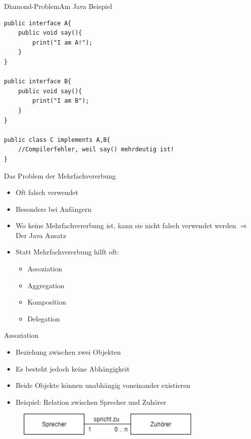 \begin{frame}[fragile]{Diamond-Problem}{Am Java Beispiel}
\lstset{style=java}
\begin{lstlisting}
public interface A{
    public void say(){
        print("I am A!");
    }
}

public interface B{
    public void say(){
        print("I am B");
    }
}

public class C implements A,B{
    //Compilerfehler, weil say() mehrdeutig ist!
}
\end{lstlisting}
\end{frame}

\begin{frame}{Das Problem der Mehrfachvererbung}
    \begin{itemize}
        \item Oft falsch verwendet
        \item Besonders bei Anfängern
        \item Wo keine Mehrfachvererbung ist, kann sie nicht falsch verwendet werden $\Rightarrow$ Der Java Ansatz
        \item Statt Mehrfachvererbung hilft oft:
        \begin{itemize}
            \item Assoziation
            \item Aggregation
            \item Komposition
            \item Delegation
        \end{itemize}
    \end{itemize}
\end{frame}

\begin{frame}{Assoziation}
\begin{itemize}
    \item Beziehung zwischen zwei Objekten
    \item Es besteht jedoch keine Abhängigkeit
    \item Beide Objekte können unabhängig voneinander existieren
    \item Beispiel: Relation zwischen Sprecher und Zuhörer
\end{itemize}
\begin{figure}
    \centering
    \includegraphics[width=0.8\textwidth]{graph/association}
\end{figure}
\end{frame}

